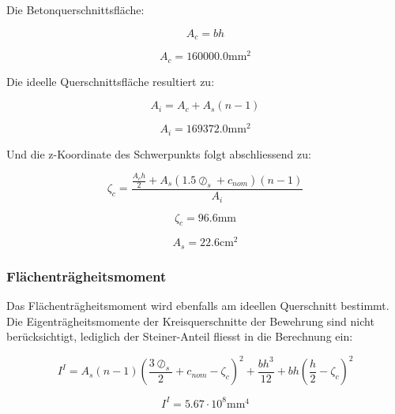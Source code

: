 \documentclass[
  letterpaper,
]{scrreprt}
\begin{document}
Die Betonquerschnittsfläche:

\begin{equation}A_{c} = b h\end{equation}

\begin{equation}A_{c} = 160000.0 \text{mm}^{2}\end{equation}

Die ideelle Querschnittsfläche resultiert zu:

\begin{equation}A_{i} = A_{c} + A_{s} \left(n - 1\right)\end{equation}

\begin{equation}A_{i} = 169372.0 \text{mm}^{2}\end{equation}

Und die z-Koordinate des Schwerpunkts folgt abschliessend zu:

\begin{equation}\zeta_{c} = \frac{\frac{A_{c} h}{2} + A_{s} \left(1.5 \oslash_{s} + c_{nom}\right) \left(n - 1\right)}{A_{i}}\end{equation}

\begin{equation}\zeta_{c} = 96.6 \text{mm}\end{equation}

\begin{equation}A_{s} = 22.6 \text{cm}^{2}\end{equation}

\hypertarget{fluxe4chentruxe4gheitsmoment}{%
\subsubsection{Flächenträgheitsmoment}\label{fluxe4chentruxe4gheitsmoment}}

Das Flächenträgheitsmoment wird ebenfalls am ideellen Querschnitt
bestimmt. Die Eigenträgheitsmomente der Kreisquerschnitte der Bewehrung
sind nicht berücksichtigt, lediglich der Steiner-Anteil fliesst in die
Berechnung ein:

\begin{equation}I^{I} = A_{s} \left(n - 1\right) \left(\frac{3 \oslash_{s}}{2} + c_{nom} - \zeta_{c}\right)^{2} + \frac{b h^{3}}{12} + b h \left(\frac{h}{2} - \zeta_{c}\right)^{2}\end{equation}

\begin{equation}I^{I} = 5.67 \cdot 10^{8} \text{mm}^{4}\end{equation}
\end{document}
